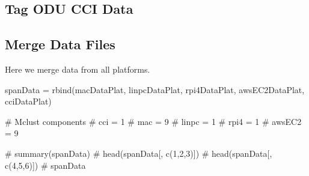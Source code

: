 \documentclass[
  letterpaper,
  DIV=11,
  numbers=noendperiod]{scrartcl}
\newenvironment{Shaded}{\begin{snugshade}}{\end{snugshade}}
\newcommand{\CommentTok}[1]{\textcolor[rgb]{0.37,0.37,0.37}{#1}}
\newcommand{\DecValTok}[1]{\textcolor[rgb]{0.68,0.00,0.00}{#1}}
\newcommand{\FunctionTok}[1]{\textcolor[rgb]{0.28,0.35,0.67}{#1}}
\newcommand{\NormalTok}[1]{\textcolor[rgb]{0.00,0.23,0.31}{#1}}
\newcommand{\OtherTok}[1]{\textcolor[rgb]{0.00,0.23,0.31}{#1}}
\newcommand{\SpecialCharTok}[1]{\textcolor[rgb]{0.37,0.37,0.37}{#1}}
\newcommand{\StringTok}[1]{\textcolor[rgb]{0.13,0.47,0.30}{#1}}
\begin{document}
\begin{Shaded}
\end{Shaded}

\hypertarget{tag-odu-cci-data}{%
\subsection{Tag ODU CCI Data}\label{tag-odu-cci-data}}

\begin{Shaded}
\end{Shaded}

\hypertarget{merge-data-files}{%
\subsection{Merge Data Files}\label{merge-data-files}}

Here we merge data from all platforms.

\begin{Shaded}
\begin{Highlighting}[]
\NormalTok{spanData }\OtherTok{=} \FunctionTok{rbind}\NormalTok{(macDataPlat, linpcDataPlat, rpi4DataPlat, }
\NormalTok{                 awsEC2DataPlat, cciDataPlat)}

\CommentTok{\# Mclust components}
    \CommentTok{\# cci = 1}
    \CommentTok{\# mac = 9}
    \CommentTok{\# linpc = 1}
    \CommentTok{\# rpi4 = 1}
    \CommentTok{\# awsEC2 = 9}

\CommentTok{\# summary(spanData)}
\CommentTok{\# head(spanData[, c(1,2,3)])}
\CommentTok{\# head(spanData[, c(4,5,6)])}
\CommentTok{\# spanData}
\end{Highlighting}
\end{Shaded}
\end{document}
